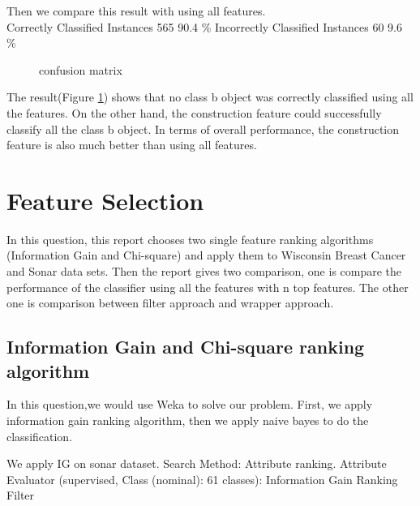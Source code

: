 \documentclass[11pt, a4paper, oneside, openright]{article}
\begin{document}
Then we compare this result with using all features.
\\
\newline Correctly Classified Instances   \hspace * {4mm}      565    \hspace * {4mm}           90.4    \%
\newline Incorrectly Classified Instances  \hspace * {4mm}      60     \hspace * {4mm}           9.6    \%
\\
  \begin{figure}[!ht]
  \centerline{}
  \caption{confusion matrix}
  \label{fig:matrix}
  \end{figure}
\newline The result(Figure \ref{fig:matrix}) shows that no class b object was correctly classified using all the features. On the other hand, the construction feature could successfully classify all the class b object. In terms of overall performance, the construction feature is also much better than using all features.  

\section{Feature Selection}
In this question, this report chooses two single feature ranking algorithms (Information Gain and Chi-square) and apply them to Wisconsin Breast Cancer and Sonar data sets. Then the report gives two comparison, one is compare the performance of the classifier using all the features with n top features. The other one is comparison between  filter approach and wrapper approach.

\subsection{Information Gain and Chi-square ranking algorithm}
In this question,we would use Weka to solve our problem.
First, we apply information gain ranking algorithm, then we apply naive bayes to do the classification.

We apply IG on sonar dataset.
Search Method:
	Attribute ranking.
Attribute Evaluator (supervised, Class (nominal): 61 classes):
Information Gain Ranking Filter
\end{document}
